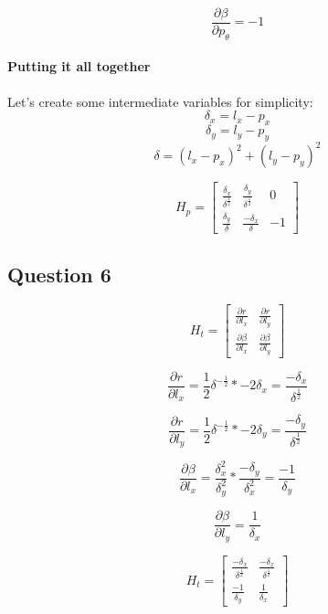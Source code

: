 \documentclass[12pt, a4paper]{article}
\begin{document}
$$\frac{\partial \beta}{\partial p_{\theta}} = -1$$

\paragraph{Putting it all together}

Let's create some intermediate variables for simplicity:
$$\delta_x = l_x - p_x$$
$$\delta_y = l_y - p_y$$
$$\delta = (l_x - p_x)^2 + (l_y - p_y)^2$$


$$H_p = 
\begin{bmatrix}
    \frac{\delta_x}{\delta^{\frac{1}{2}}} & \frac{\delta_y}{\delta^{\frac{1}{2}}}  & 0 \\
    \frac{\delta_y}{\delta} & \frac{-\delta_x}{\delta} & -1
\end{bmatrix}$$

\clearpage
\subsection{Question 6}

$$H_t = 
\begin{bmatrix}
    \frac{\partial r}{\partial l_x} & \frac{\partial r}{\partial l_y} \\
    \frac{\partial \beta}{\partial l_x} & \frac{\partial \beta}{\partial l_y}
\end{bmatrix}$$

$$\frac{\partial r}{\partial l_x} = \frac{1}{2} \delta^{-\frac{1}{2}} * -2\delta_x = \frac{-\delta_x}{\delta^{\frac{1}{2}}}$$

$$\frac{\partial r}{\partial l_y} = \frac{1}{2} \delta^{-\frac{1}{2}} * -2\delta_y = \frac{-\delta_y}{\delta^{\frac{1}{2}}}$$

$$\frac{\partial \beta}{\partial l_x} = \frac{\delta_x^2}{\delta_y^2} * \frac{-\delta_y}{\delta_x^2} = \frac{-1}{\delta_y}$$

$$\frac{\partial \beta}{\partial l_y} = \frac{1}{\delta_x}$$

$$H_t = 
\begin{bmatrix}
    \frac{-\delta_x}{\delta^{\frac{1}{2}}} & \frac{-\delta_x}{\delta^{\frac{1}{2}}} \\
    \frac{-1}{\delta_y} & \frac{1}{\delta_x}
\end{bmatrix}$$
\end{document}
